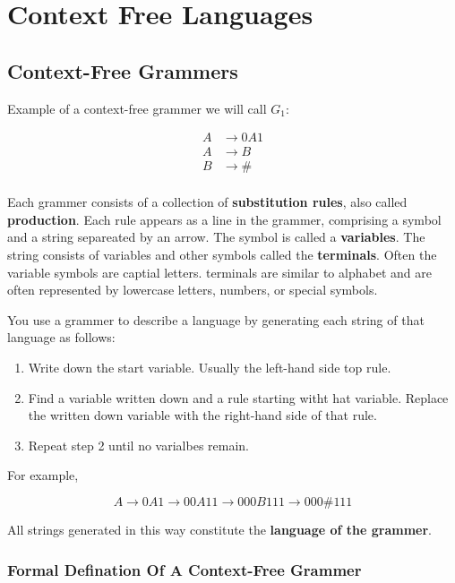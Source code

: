 \chapter{Context Free Languages}

\section{Context-Free Grammers}

Example of a context-free grammer we will call $G_1$:

\begin{align*}
    A &\rightarrow 0A1 \\
    A &\rightarrow B \\  
    B &\rightarrow \# \\
\end{align*}    

Each grammer consists of a collection of \textbf{substitution rules}, also
called \textbf{production}. Each rule appears as a line in the grammer, 
comprising a symbol and a string separeated by an arrow. The symbol is called
a \textbf{variables}. The string consists of variables and other symbols called
the \textbf{terminals}. Often the variable symbols are captial letters. terminals
are similar to alphabet and are often represented by lowercase letters, numbers,
or special symbols.

You use a grammer to describe a language by generating each string of that
language as follows:

\begin{enumerate}
    \item Write down the start variable. Usually the left-hand side top rule.
    \item Find a variable written down and a rule starting witht hat variable.
        Replace the written down variable with the right-hand side of that rule.
    \item Repeat step 2 until no varialbes remain.
\end{enumerate}

For example, 

$$
A \rightarrow 0A1 \rightarrow 00A11 \rightarrow 000B111 \rightarrow 000\#111
$$

All strings generated in this way constitute the \textbf{language of the grammer}.

\subsection{Formal Defination Of A Context-Free Grammer} 

